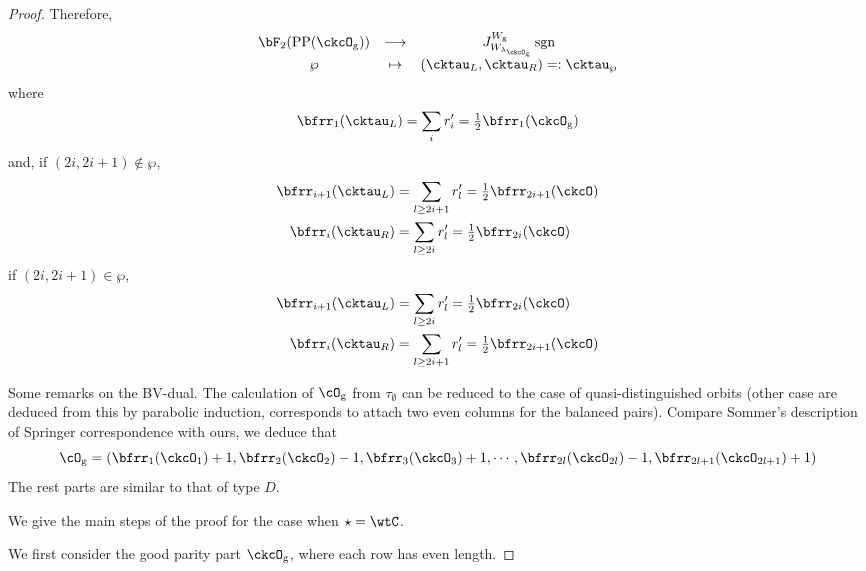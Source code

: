 \documentclass[12pt,a4paper]{amsart}
\newcommand{\sgn}{\operatorname{sgn}}
\numberwithin{equation}{section}
\theoremstyle{remark}
\def\half{{\tfrac{1}{2}}}
\def\lamckg{\lambda_{\ckcO_{\mathrm g}}}
\def\CPP{\mathrm{PP}}
\begin{document}
\begin{proof}
{      Therefore,
      \[
        \begin{array}{ccc}
          \bF_{2}(\CPP(\ckcO_{\mathrm g}))&\longrightarrow
          & J_{W_{\lamckg}}^{W_{\mathrm g}} \sgn \\
          \wp&\mapsto&    (\cktau_{L},\cktau_{R}) =:\cktau_{\wp}
        \end{array}
      \]
      where
      \[
        \bfrr_{1}(\cktau_{L}) = \sum_{i} r'_{i} = \half \bfrr_{1}(\ckcO_{\mathrm g})
      \]
      and, if $(2i,2i+1)\notin \wp$,
      \[
        \begin{split}
          \bfrr_{i+1}(\cktau_{L}) & = \sum_{l\geq 2i+1} r'_{l}
          = \half\bfrr_{2i+1}(\ckcO)\\
          \bfrr_{i}(\cktau_{R}) & = \sum_{l\geq 2i} r'_{l} = \half\bfrr_{2i}(\ckcO)
        \end{split}
      \]
      if $(2i,2i+1)\in \wp$,
      \[
        \begin{split}
          \bfrr_{i+1}(\cktau_{L}) & = \sum_{l\geq 2i} r'_{l}
          = \half\bfrr_{2i}(\ckcO)\\
          \bfrr_{i}(\cktau_{R}) & = \sum_{l\geq 2i+1} r'_{l} = \half\bfrr_{2i+1}(\ckcO)
        \end{split}
      \]

      Some remarks on the BV-dual. The calculation of $\cO_{\mathrm g}$ from
      $\tau_{\emptyset}$ can be reduced to the case of quasi-distinguished
      orbits (other case are deduced from this by parabolic induction,
      corresponds to attach two even columns for the balanced pairs). Compare
      Sommer's description of Springer correspondence with ours, we deduce that
      \[
        \cO_{\mathrm g} = (\bfrr_{1}(\ckcO_{1})+1,\bfrr_{2}(\ckcO_{2})-1,\bfrr_{3}(\ckcO_{3})+1, \cdots, \bfrr_{2l}(\ckcO_{2l})-1,\bfrr_{2l+1}(\ckcO_{2l+1})+1)
      \]
      The rest parts are similar to that of type $D$.
    }


    We give the main steps of the proof for the case when $\star = \wtC$.


    We first consider the good parity part $\ckcO_{\mathrm g}$, where each row has
    even length.


\end{proof}
\end{document}
